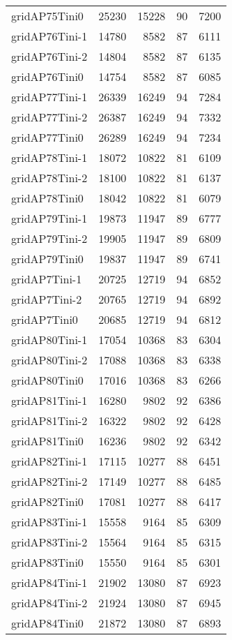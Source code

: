 \begin{longtable}{lrrrr}
gridAP75Tini0 & 25230 & 15228 & 90 & 7200 \\
gridAP76Tini-1 & 14780 & 8582 & 87 & 6111 \\
gridAP76Tini-2 & 14804 & 8582 & 87 & 6135 \\
gridAP76Tini0 & 14754 & 8582 & 87 & 6085 \\
gridAP77Tini-1 & 26339 & 16249 & 94 & 7284 \\
gridAP77Tini-2 & 26387 & 16249 & 94 & 7332 \\
gridAP77Tini0 & 26289 & 16249 & 94 & 7234 \\
gridAP78Tini-1 & 18072 & 10822 & 81 & 6109 \\
gridAP78Tini-2 & 18100 & 10822 & 81 & 6137 \\
gridAP78Tini0 & 18042 & 10822 & 81 & 6079 \\
gridAP79Tini-1 & 19873 & 11947 & 89 & 6777 \\
gridAP79Tini-2 & 19905 & 11947 & 89 & 6809 \\
gridAP79Tini0 & 19837 & 11947 & 89 & 6741 \\
gridAP7Tini-1 & 20725 & 12719 & 94 & 6852 \\
gridAP7Tini-2 & 20765 & 12719 & 94 & 6892 \\
gridAP7Tini0 & 20685 & 12719 & 94 & 6812 \\
gridAP80Tini-1 & 17054 & 10368 & 83 & 6304 \\
gridAP80Tini-2 & 17088 & 10368 & 83 & 6338 \\
gridAP80Tini0 & 17016 & 10368 & 83 & 6266 \\
gridAP81Tini-1 & 16280 & 9802 & 92 & 6386 \\
gridAP81Tini-2 & 16322 & 9802 & 92 & 6428 \\
gridAP81Tini0 & 16236 & 9802 & 92 & 6342 \\
gridAP82Tini-1 & 17115 & 10277 & 88 & 6451 \\
gridAP82Tini-2 & 17149 & 10277 & 88 & 6485 \\
gridAP82Tini0 & 17081 & 10277 & 88 & 6417 \\
gridAP83Tini-1 & 15558 & 9164 & 85 & 6309 \\
gridAP83Tini-2 & 15564 & 9164 & 85 & 6315 \\
gridAP83Tini0 & 15550 & 9164 & 85 & 6301 \\
gridAP84Tini-1 & 21902 & 13080 & 87 & 6923 \\
gridAP84Tini-2 & 21924 & 13080 & 87 & 6945 \\
gridAP84Tini0 & 21872 & 13080 & 87 & 6893 \\

\end{longtable}

